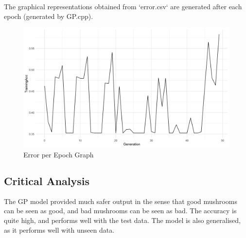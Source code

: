\documentclass{article}
\begin{document}
The graphical representations obtained from `error.csv` are generated after each epoch (generated by GP.cpp).
    \begin{figure}[H]
        \includegraphics[width=\linewidth]{GP_trainingacc.png}
        \caption{Error per Epoch Graph}
        \label{fig:epoch}
    \end{figure}

\subsection{Critical Analysis}
The GP model provided much safer output in the sense that good mushrooms can be seen as good, and bad mushrooms can be seen as bad. The accuracy is quite high, and performs well with the test data. The model is also generalised, as it performs well with unseen data.
\end{document}
